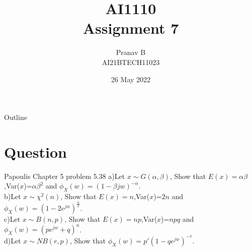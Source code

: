 \documentclass{beamer}
\title{AI1110 \\ Assignment 7}
\author{Pranav B \\ AI21BTECH11023}
\date{26 May 2022}
\begin{document}
	\begin{frame}
		\titlepage
	\end{frame}
	
	\begin{frame}{Outline}
    		\tableofcontents
	\end{frame}
	
	\section{Question}
	\begin{frame}{ Papoulis Chapter 5 problem 5.38}
a)Let $x\sim G(\alpha,\beta)$, Show that $E(x)=\alpha\beta$,Var($x$)=$\alpha\beta^2$ and $\phi_{X}(w)=(1-\beta jw)^{-\alpha}$.\\
b)Let $x \sim \chi ^2(n)$, Show that $E(x)=n$,Var($x$)=$2n$ and $\phi_{X}(w)=(1-2 e^{jw})^{\frac{n}{2}}$.\\
c)Let $x \sim B(n,p)$, Show that $E(x)=np$,Var($x$)=$npq$ and $\phi_{X}(w)=( pe^{jw}+q)^{n}$.\\
d)Let $x \sim N B(r,p)$, Show that $\phi_{X}(w)=p'(1-qe^{jw})^{-r}$.\\
	\end{frame}
\end{document}
